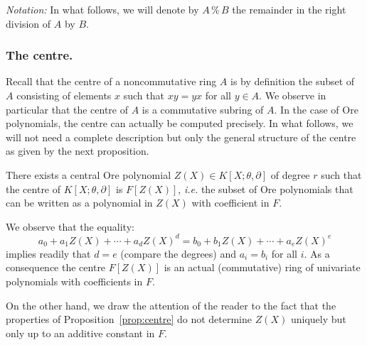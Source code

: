 \documentclass[a4paper]{llncs}
\renewcommand{\mod}{\,\%\,}
\begin{document}
\medskip

\noindent
\textit{Notation:}
In what follows, we will denote by $A \mod B$ the remainder in the 
right division of $A$ by $B$.

\subsubsection*{The centre.}

Recall that the centre of a noncommutative ring $A$ is by definition
the subset of $A$ consisting of elements $x$ such that $xy = yx$ for
all $y \in A$. We observe in particular that the centre of $A$ is a
commutative subring of $A$.
In the case of Ore polynomials, the centre can actually be computed
precisely.
In what follows, we will not need a complete description but only
the general structure of the centre as given by the next proposition.

\begin{proposition}
\label{prop:centre}
There exists a central Ore polynomial $Z(X) \in K[X; \theta, \partial]$ of 
degree $r$ such that the centre of $K[X; \theta, \partial]$ is 
$F[Z(X)]$, \emph{i.e.} the subset of Ore polynomials that can be
written as a polynomial in $Z(X)$ with coefficient in $F$.
\end{proposition}

We observe that the equality:
$$a_0 + a_1 Z(X) + \cdots + a_d Z(X)^d 
= b_0 + b_1 Z(X) + \cdots + a_e Z(X)^e$$
implies readily that $d = e$ (compare the degrees) and $a_i = b_i$ 
for all $i$. As a consequence the centre $F[Z(X)]$ is an actual
(commutative) ring of univariate polynomials with coefficients in $F$.

On the other hand, we draw the attention of the reader to the fact that 
the properties of Proposition~\ref{prop:centre} do not determine $Z(X)$ 
uniquely but only up to an additive constant in $F$.
\end{document}
